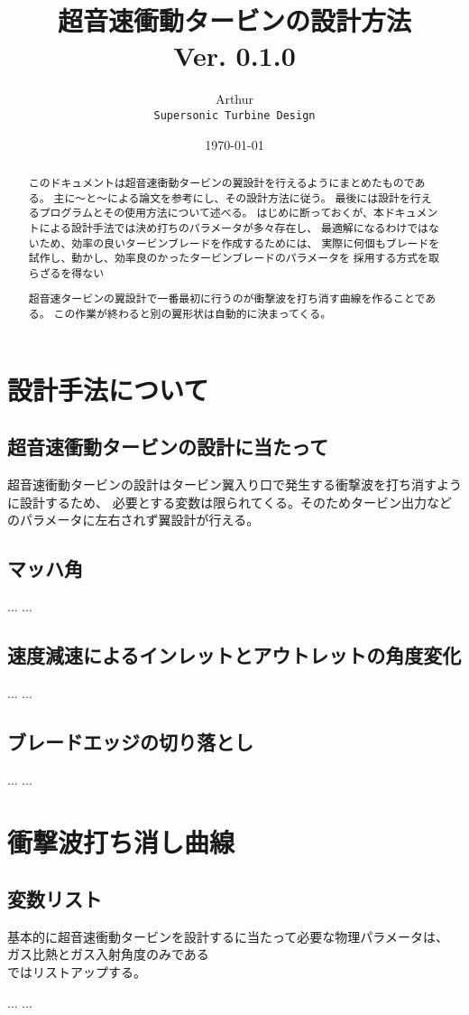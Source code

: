 \documentclass[a4j,10pt,oneside,openany]{jsbook}
\title{{\Huge \textbf{超音速衝動タービンの設計方法}}\\ {\small Ver. 0.1.0}}
\author{Arthur\\ \texttt{Supersonic Turbine Design}}
\date{\today}
\begin{document}
%
%
\maketitle
\frontmatter
\tableofcontents
%
%
\mainmatter

\chapter{設計手法について}
\begin{abstract}

このドキュメントは超音速衝動タービンの翼設計を行えるようにまとめたものである。
主に〜と〜による論文を参考にし、その設計方法に従う。
最後には設計を行えるプログラムとその使用方法について述べる。
はじめに断っておくが、本ドキュメントによる設計手法では決め打ちのパラメータが多々存在し、
最適解になるわけではないため、効率の良いタービンブレードを作成するためには、
実際に何個もブレードを試作し、動かし、効率良のかったタービンブレードのパラメータを
採用する方式を取らざるを得ない

\end{abstract}

\section{超音速衝動タービンの設計に当たって}
超音速衝動タービンの設計はタービン翼入り口で発生する衝撃波を打ち消すように設計するため、
必要とする変数は限られてくる。そのためタービン出力などのパラメータに左右されず翼設計が行える。

\section{マッハ角}
...
...

\section{速度減速によるインレットとアウトレットの角度変化}
...
...

\section{ブレードエッジの切り落とし}
...
...

\chapter{衝撃波打ち消し曲線}
\begin{abstract}
超音速タービンの翼設計で一番最初に行うのが衝撃波を打ち消す曲線を作ることである。
この作業が終わると別の翼形状は自動的に決まってくる。
\end{abstract}

\section{変数リスト}
基本的に超音速衝動タービンを設計するに当たって必要な物理パラメータは、
ガス比熱とガス入射角度のみである\\

ではリストアップする。

\begin{thebibliography}{20}
...
...
\end{thebibliography}

\newpage
\printindex
%
%
\end{document}
